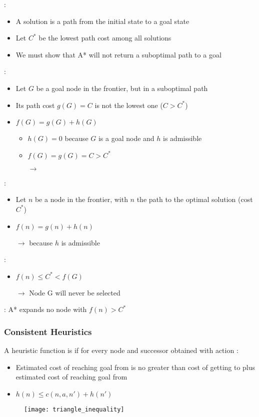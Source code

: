  :
\begin{itemize}
\item A solution is a path from the initial state to a goal state
\item Let $C^*$ be the lowest path cost among all solutions
\item We must show that A* will not return a suboptimal path to a goal
\end{itemize}
 :
\begin{itemize}
\item Let $G$ be a goal node in the frontier, but in a suboptimal path
\item Its path cost $g(G)=C$ is not the lowest one ($C>C^*$)
\item $f(G) = g(G) + h(G)$
	\begin{itemize}
	\item $h(G) = 0$ because $G$ is a goal node and $h$ is admissible
	\item $f(G) = g(G) = C > C^*$
	\item[$\rightarrow$] 
	\end{itemize}
\end{itemize}
 :
\begin{itemize}
\item Let $n$ be a node in the frontier, with $n$ the path to the optimal solution (cost $C^*$)
\item $f(n) = g(n) + h(n)$
\item[$\rightarrow$]  because $h$ is admissible
\end{itemize}
 :
\begin{itemize}
\item $f(n) \leq C^* < f(G)$
\item[$\rightarrow$] Node G will never be selected
\end{itemize}
 : A* expands no node with $f(n) > C^*$

\subsubsection{Consistent Heuristics}

A heuristic function is  if for every node  and successor  obtained with action  :


\begin{minipage}{0.6\textwidth}
	\begin{itemize}
	\item Estimated cost of reaching goal from  is no greater than cost of getting to  plus estimated cost of reaching goal from 
	\item $h(n) \leq c(n, a, n') + h(n')$
	\end{itemize}
\end{minipage}
\begin{minipage}{0.4\textwidth}
	\begin{figure}[H]
		\centering
		\texttt{[image: triangle\_inequality]}
	\end{figure}
\end{minipage}

